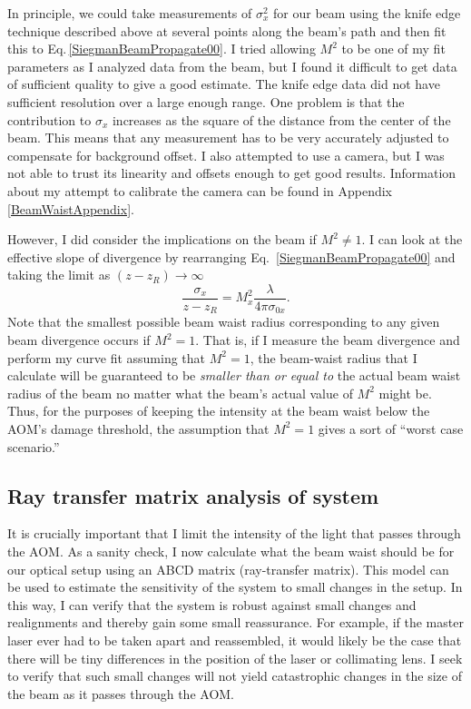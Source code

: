 In principle, we could take measurements of $\sigma_x^2$ for our beam using the knife edge technique described above at several points along the beam's path and then fit this to Eq.\,\ref{SiegmanBeamPropagate00}.
I tried allowing $M^2$ to be one of my fit parameters as I analyzed data from the beam, but I found it difficult to get data of sufficient quality to give a good estimate. The knife edge data did not have sufficient resolution over a large enough range. One problem is that the contribution to $\sigma_x$ increases as the square of the distance from the center of the beam. This means that any measurement has to be very accurately adjusted to compensate for background offset. I also attempted to use a camera, but I was not able to trust its linearity and offsets enough to get good results. Information about my attempt to calibrate the camera can be found in Appendix\,\ref{BeamWaistAppendix}. 

However, I did consider the implications on the beam if $M^2\neq 1$. I can look at the effective slope of divergence by rearranging Eq.\ \ref{SiegmanBeamPropagate00} and taking the limit as $(z-z_R) \rightarrow \infty$
\begin{equation}
\frac{\sigma_x}{z-z_R}=M_x^2 \frac{\lambda }{4 \pi \sigma_{0x}} \label{SiegmanBeamSlope}.
\end{equation}
Note that the smallest possible beam waist radius corresponding to any given beam divergence occurs if $M^2=1$. That is, if I measure the beam divergence and perform my curve fit assuming that $M^2=1$, the beam-waist radius that I calculate will be guaranteed to be \emph{smaller than or equal to} the actual beam waist radius of the beam no matter what the beam's actual value of $M^2$ might be. Thus, for the purposes of keeping the intensity at the beam waist below the AOM's damage threshold, the assumption that $M^2=1$ gives a sort of ``worst case scenario.'' 

\subsection{Ray transfer matrix analysis of system}
It is crucially important that I limit the intensity of the light that passes through the AOM. As a sanity check, I now calculate what the beam waist should be for our optical setup using an ABCD matrix (ray-transfer matrix). This model can be used to estimate the sensitivity of the system to small changes in the setup. In this way, I can verify that the system is robust against small changes and realignments and thereby gain some small reassurance. For example, if the master laser ever had to be taken apart and reassembled, it would likely be the case that there will be tiny differences in the position of the laser or collimating lens. I seek to verify that such small changes will not yield catastrophic changes in the size of the beam as it passes through the AOM.  

